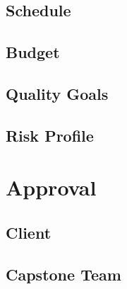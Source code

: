 \documentclass[10pt,letterpaper]{article}
\begin{document}
\subsection{Schedule}


\subsection{Budget}\label{budget}


\subsection{Quality Goals}


\subsection{Risk Profile}


\clearpage
\section{Approval}




\subsection*{Client}


\subsection*{Capstone Team}



\clearpage
{}



\end{document}
